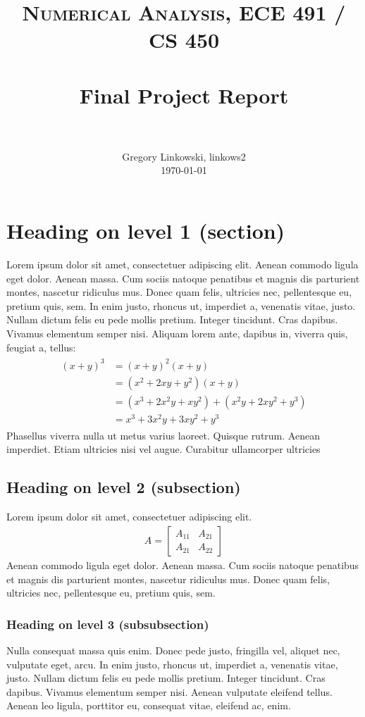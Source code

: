 \documentclass[paper=a4, fontsize=11pt]{scrartcl}
\title{
		\usefont{OT1}{bch}{b}{n}
		\normalfont \normalsize \textsc{Numerical Analysis, ECE 491 / CS 450} \\ [25pt]
		\horrule{0.5pt} \\[0.4cm]
		\huge Final Project Report \\
		\horrule{2pt} \\[0.5cm]
}
\author{
		\normalfont 								\normalsize
        Gregory Linkowski, linkows2\\[-3pt]		\normalsize
        \today
}
\date{}
\numberwithin{equation}{section}		%
\numberwithin{figure}{section}			%
\numberwithin{table}{section}				%
\begin{document}
\maketitle
\section{Heading on level 1 (section)}
Lorem ipsum dolor sit amet, consectetuer adipiscing elit. Aenean commodo ligula eget dolor. Aenean massa. Cum sociis natoque penatibus et magnis dis parturient montes, nascetur ridiculus mus. Donec quam felis, ultricies nec, pellentesque eu, pretium quis, sem. In enim justo, rhoncus ut, imperdiet a, venenatis vitae, justo. Nullam dictum felis eu pede mollis pretium. Integer tincidunt. Cras dapibus. Vivamus elementum semper nisi. Aliquam lorem ante, dapibus in, viverra quis, feugiat a, tellus:
\begin{align} 
	\begin{split}
	(x+y)^3 	&= (x+y)^2(x+y)\\
					&=(x^2+2xy+y^2)(x+y)\\
					&=(x^3+2x^2y+xy^2) + (x^2y+2xy^2+y^3)\\
					&=x^3+3x^2y+3xy^2+y^3
	\end{split}					
\end{align}
Phasellus viverra nulla ut metus varius laoreet. Quisque rutrum. Aenean imperdiet. Etiam ultricies nisi vel augue. Curabitur ullamcorper ultricies 

\subsection{Heading on level 2 (subsection)}
Lorem ipsum dolor sit amet, consectetuer adipiscing elit. 
\begin{align}
	A = 
	\begin{bmatrix}
	A_{11} & A_{21} \\
  	A_{21} & A_{22}
	\end{bmatrix}
\end{align}
Aenean commodo ligula eget dolor. Aenean massa. Cum sociis natoque penatibus et magnis dis parturient montes, nascetur ridiculus mus. Donec quam felis, ultricies nec, pellentesque eu, pretium quis, sem.

\subsubsection{Heading on level 3 (subsubsection)}
Nulla consequat massa quis enim. Donec pede justo, fringilla vel, aliquet nec, vulputate eget, arcu. In enim justo, rhoncus ut, imperdiet a, venenatis vitae, justo. Nullam dictum felis eu pede mollis pretium. Integer tincidunt. Cras dapibus. Vivamus elementum semper nisi. Aenean vulputate eleifend tellus. Aenean leo ligula, porttitor eu, consequat vitae, eleifend ac, enim.
\end{document}
